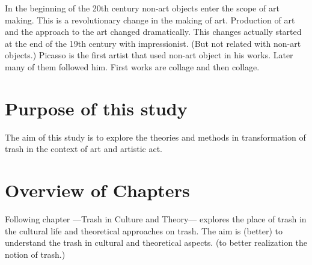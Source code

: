 


In the beginning of the 20th century non-art objects enter the scope of art making. This is a revolutionary change in the making of art. Production of art and the approach to the art changed dramatically. This changes actually started at the end of the 19th century with impressionist. (But not related with non-art objects.) Picasso is the first artist that used non-art object in his works. Later many of them followed him. First works are collage and then collage.  




\section{Purpose of this study}

The aim of this study is to explore the theories and methods in transformation of trash in the context of art and artistic act.


\section{Overview of Chapters}
Following chapter ---Trash in Culture and Theory--- explores the place of trash in the cultural life and theoretical approaches on trash. The aim is (better) to understand the trash in cultural and theoretical aspects. (to better realization the notion of trash.)

